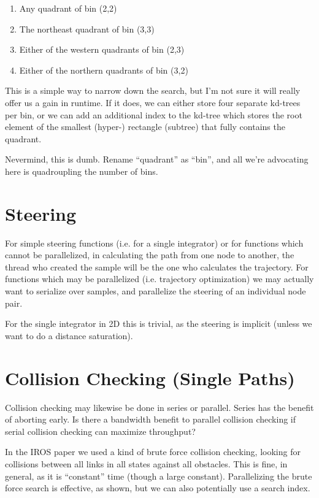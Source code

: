 \begin{enumerate}
    \item Any quadrant of bin (2,2)
    \item The northeast quadrant of bin (3,3)
    \item Either of the western quadrants of bin (2,3)
    \item Either of the northern quadrants of bin (3,2)
\end{enumerate}

This is a simple way to narrow down the search, but I'm not sure it will really offer us a gain in runtime. If it does, we can either store four separate kd-trees per bin, or we can add an additional index to the kd-tree which stores the root element of the smallest (hyper-) rectangle (subtree) that fully contains the quadrant.

Nevermind, this is dumb. Rename ``quadrant'' as ``bin'', and all we're advocating here is quadroupling the number of bins.





\section{Steering}

For simple steering functions (i.e. for a single integrator) or for functions which cannot be parallelized, in calculating the path from one node to another, the thread who created the sample will be the one who calculates the trajectory. For functions which may be parallelized (i.e. trajectory optimization) we may actually want to serialize over samples, and parallelize the steering of an individual node pair. 

For the single integrator in 2D this is trivial, as the steering is implicit (unless we want to do a distance saturation).

\section{Collision Checking (Single Paths)}

Collision checking may likewise be done in series or parallel. Series has the benefit of aborting early. Is there a bandwidth benefit to parallel collision checking if serial collision checking can maximize throughput?

In the IROS paper we used a kind of brute force collision checking, looking for collisions between all links in all states against all obstacles. This is fine, in general, as it is ``constant'' time (though a large constant). Parallelizing the brute force search is effective, as shown, but we can also potentially use a search index. 


